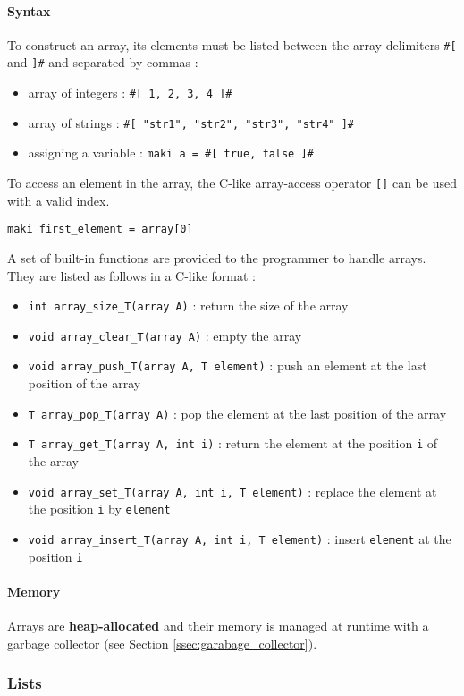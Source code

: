 \documentclass[a4paper,11pt]{article}
\begin{document}
\paragraph{Syntax}
To construct an array, its elements must be listed between the array delimiters \texttt{\#[} and \texttt{]\#} and separated by commas  : 
\begin{itemize}
	\item array of integers : \texttt{\#[ 1, 2, 3, 4 ]\#} 
	\item array of strings : \texttt{\#[ "str1", "str2", "str3", "str4" ]\#} 
	\item assigning a variable : \texttt{maki a = \#[ true, false ]\#}
\end{itemize}
To access an element in the array, the C-like array-access operator \texttt{[]} can be used with a valid index. 
\begin{center}
	\texttt{maki first\_element = array[0]}
\end{center}
A set of built-in functions are provided to the programmer to handle arrays. They are listed as follows in a C-like format :
\begin{itemize}
	\item \texttt{int array\_size\_T(array A)} : return the size of the array
	\item \texttt{void array\_clear\_T(array A)} : empty the array
	\item \texttt{void array\_push\_T(array A, T element)} : push an element at the last position of the array
	\item \texttt{T array\_pop\_T(array A)} : pop the element at the last position of the array
	\item \texttt{T array\_get\_T(array A, int i)} : return the element at the position \texttt{i} of the array
	\item \texttt{void array\_set\_T(array A, int i, T element)} : replace the element at the position \texttt{i} by \texttt{element}
	\item \texttt{void array\_insert\_T(array A, int i, T element)} : insert \texttt{element} at the position \texttt{i}
\end{itemize}
\paragraph{Memory} Arrays are \textbf{heap-allocated} and their memory is managed at runtime with a garbage collector (see Section \ref{ssec:garabage_collector}).

\subsubsection{Lists} 
\label{sssec:lists}
\end{document}
